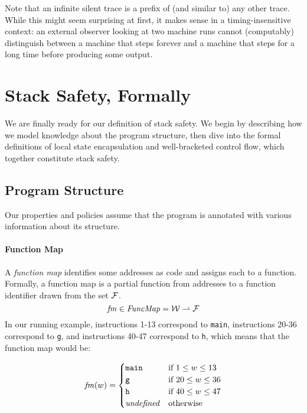 \documentclass[acmsmall,review,anonymous]{acmart}\settopmatter{printfolios=true,printccs=false,printacmref=false}
\begin{document}
{Note that an infinite silent trace is a
prefix of (and similar to) any other trace. While this might seem
surprising at first, it makes sense in a timing-insensitive context:
an external observer looking at two machine runs cannot (computably)
distinguish between a machine that steps forever and a machine that
steps for a long time before producing some output.

\section{Stack Safety, Formally}
\label{sec:lse-and-wbcf}

We are finally ready for our definition of stack safety. We begin
by describing how we model knowledge about the program structure,
then dive into the formal definitions of local state encapsulation and
well-bracketed control flow, which together constitute stack safety.

\subsection{Program Structure}

Our properties and policies assume that the program is annotated
with various information about its structure.

\paragraph*{Function Map}

A {\em function map} identifies some addresses as code and assigns
each to a function. Formally, a function map is a
partial function from addresses to a function
identifier drawn from the set \(\mathcal{F}\).
\[\mathit{fm} \in \mathit{FuncMap} = {\mathcal W} \rightharpoonup \mathcal{F}\]
%
In our running example, instructions 1-13 correspond to {\tt main},
instructions 20-36 correspond to {\tt g}, and instructions 40-47
correspond to {\tt h}, which means that the function map would be:

\[ \mathit{fm}(w) = 
  \begin{cases}
    \texttt{main} & \text{if } 1 \leq w \leq 13 \\
    \texttt{g} & \text{if } 20 \leq w \leq 36 \\
    \texttt{h} & \text{if } 40 \leq w \leq 47 \\
    \mathit{undefined} & \text {otherwise}\\
  \end{cases}
\]

}
\end{document}
